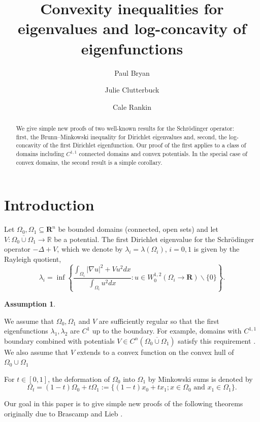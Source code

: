 \documentclass[12pt]{amsart}
\title{Convexity inequalities for eigenvalues and log-concavity of eigenfunctions}
\author{Paul Bryan}
\author{Julie Clutterbuck}
\author{Cale Rankin}
\date{}
\theoremstyle{definition}
\newtheorem{assume}[thm]{Assumption}
\theoremstyle{remark}
\begin{document}
\maketitle
\begin{abstract}
  We give simple new proofs of two well-known results for the Schr\"odinger operator: first, the Brunn--Minkowski inequality for Dirichlet eigenvalues and, second, the log-concavity of the first Dirichlet eigenfunction. Our proof of the first applies to a class of domains including $C^{1,1}$ connected domains and convex potentials. In the special case of convex domains, the second result is a simple corollary.
\end{abstract}

\section{Introduction}
\label{sec:org46972ca} Let \(\Omega_0, \Omega_1 \subseteq \mathbf{R}^n\) be bounded domains (connected,
open sets) and let $V : \overline{\Omega_0 \cup \Omega_1} \to \mathbb{R}$ be a potential. The first
Dirichlet eigenvalue for the Schr\"odinger operator $-\Delta + V$, which we denote by \(\lambda_i =
\lambda(\Omega_i)\), \(i=0,1\) is given by the Rayleigh quotient,
\[ \lambda_i = \inf \left\{\frac{\int_{\Omega_i} |\nabla u|^2 + Vu^2dx}{\int_{\Omega_i} u^2 dx} : u \in
W^{1,2}_{0} (\Omega_i \to \mathbf{R}) \backslash \{0\}\right\}.
\]

\begin{assume}
\label{regularity-assumption}

We assume that $\Omega_0, \Omega_1$ and $V$ are sufficiently regular so that the first eigenfunctions $\lambda_1, \lambda_2$ are $C^1$ up to the boundary. For example, domains with $C^{1,1}$ boundary combined with potentials $V \in C^\alpha(\overline{\Omega_0 \cup \Omega_1})$ satisfy this requirement \cite[Theorem 9.15]{MR1814364}. We also assume that $V$ extends to a convex function on the convex hull of $\Omega_0 \cup \Omega_1$
\end{assume}

For \(t \in [0, 1]\), the deformation of $\Omega_0$ into $\Omega_1$ by Minkowski sums is denoted by
\begin{equation}
  \label{eq:mink-sum-def} \Omega_t = (1-t)\Omega_0 + t \Omega_1 := \{ (1-t)x_0+tx_1 ; x \in \Omega_0
\text{ and } x_1 \in \Omega_1\}.
\end{equation}

Our goal in this paper is to give simple new proofs of the following theorems originally due to
Brascamp and Lieb \cite{zbMATH03522267}.
\end{document}
